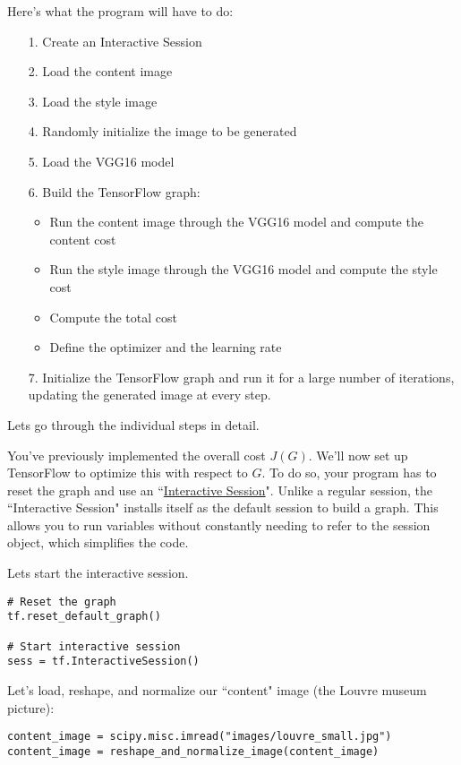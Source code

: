 {Here's what the program will have to do:
\begin{itemize}
\item[1.] Create an Interactive Session
\item[2.] Load the content image 
\item[3.] Load the style image
\item[4.] Randomly initialize the image to be generated 
\item[5.] Load the VGG16 model\label{Load_VGG16}
\item[6.] Build the TensorFlow graph:
    \begin{itemize}
    \item Run the content image through the VGG16 model and compute the content cost
    \item Run the style image through the VGG16 model and compute the style cost
    \item Compute the total cost
    \item Define the optimizer and the learning rate
    \end{itemize}
\item[7.] Initialize the TensorFlow graph and run it for a large number of iterations, updating the generated image at every step.
\end{itemize}

Lets go through the individual steps in detail. 

You've previously implemented the overall cost $J(G)$. We'll now set up TensorFlow to optimize this with respect to $G$. To do so, your program has to reset the graph and use an ``\href{https://www.tensorflow.org/api_docs/python/tf/InteractiveSession}{Interactive Session}". Unlike a regular session, the ``Interactive Session" installs itself as the default session to build a graph.  This allows you to run variables without constantly needing to refer to the session object, which simplifies the code.  

Lets start the interactive session.
\begin{verbatim}
# Reset the graph
tf.reset_default_graph()

# Start interactive session
sess = tf.InteractiveSession()
\end{verbatim}

Let's load, reshape, and normalize our ``content" image (the Louvre museum picture):
\begin{verbatim}
content_image = scipy.misc.imread("images/louvre_small.jpg")
content_image = reshape_and_normalize_image(content_image)
\end{verbatim}

}
